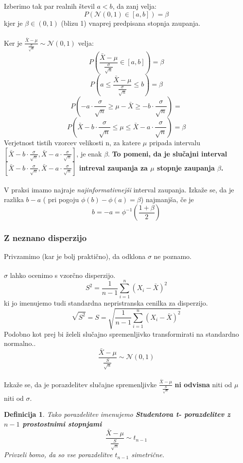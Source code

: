 \documentclass[11pt]{article}
\newtheorem{Definicija}[Izrek]{{\sc Definicija}}
\begin{document}
Izberimo tak par realnih števil $a < b$, da zanj velja:
$$ P(\mathcal{N}(0,1) \in [a,b]) = \beta$$
kjer je $\beta \in (0,1)$ (blizu 1) vnaprej predpisana stopnja zaupanja.
\\
\\
Ker je $\frac{\bar{X} - \mu}{\frac{\sigma}{\sqrt{n}}}\sim \mathcal{N}(0,1)$ velja:
$$P\left(\frac{\bar{X} - \mu}{\frac{\sigma}{\sqrt{n}}}\in [a,b]\right) = \beta$$
$$P\left(a \le \frac{\bar{X} - \mu}{\frac{\sigma}{\sqrt{n}}}  \le b \right) = \beta $$
$$P(-a\cdot \frac{\sigma}{\sqrt{n}} \ge \mu - \bar{X}\ge -b\cdot \frac{\sigma}{\sqrt{n}})=$$
$$P(\bar{X}-b\cdot \frac{\sigma}{\sqrt{n}} \le \mu \le \bar{X} - a\cdot \frac{\sigma}{\sqrt{n}}) = \beta
$$
Verjetnost tistih vzorcev velikosti n, za katere $\mu$ pripada intervalu $[\bar{X}-b\cdot \frac{\sigma}{\sqrt{n}}, \bar{X} - a\cdot \frac{\sigma}{\sqrt{n}}]$, je enak $\beta$.
\textbf{To pomeni, da je slučajni interval $[\bar{X}-b\cdot \frac{\sigma}{\sqrt{n}}, \bar{X} - a\cdot \frac{\sigma}{\sqrt{n}}]$ intreval zaupanja za  $\mu$  stopnje zaupanja $\beta$.}
\\
\\
V praksi imamo najraje \textit{najinformativnejši} interval zaupanja. Izkaže se, da je razlika $b-a$ ( pri pogoju $\phi(b) - \phi(a) = \beta$) najmanjša, če je 
$$b = -a = \phi^{-1}\left(\frac{1+\beta}{2}\right)$$ 

\subsubsection{Z neznano disperzijo}
Privzamimo (kar je bolj praktično), da odklona $\sigma$ ne poznamo.
\\
\\
$\sigma$ lahko ocenimo s vzorčno disperzijo.
$$S^2 = \frac{1}{n-1}\sum_{i = 1}^{n}({X_i- \bar{X}})^2$$
ki jo imenujemo tudi standardna nepristranska cenilka za disperzijo.
$$\sqrt{S^2}= S = \sqrt{\frac{1}{n-1}\sum_{i = 1}^{n}({X_i- \bar{X}})^2}$$
Podobno kot prej bi želeli slučajno spremenljivko transformirati na standardno normalno..
$$\frac{\bar{X}- \mu}{\frac{S}{\sqrt{n}}} \sim \mathcal{N}(0,1)$$
\\
Izkaže se, da je porazdelitev slučajne spremenljivke $\frac{\bar{X}- \mu}{\frac{S}{\sqrt{n}}}$ \textbf{ni odvisna } niti od $\mu$ niti od $\sigma$.
\\

\begin{Definicija}
	Tako porazdelitev imenujemo \textbf{Studentova t- porazdelitev z $n-1$ prostostnimi stopnjami}
	$$\frac{\bar{X}- \mu}{\frac{S}{\sqrt{n}}}\sim t_{n-1}$$
	Privzeli bomo, da so vse porazdelitve $t_{n-1}$ simetrične.
\end{Definicija}
\end{document}
